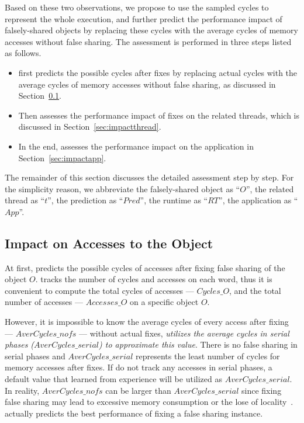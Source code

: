Based on these two observations, we propose to use the sampled cycles to represent the whole execution, and further predict the performance impact of falsely-shared objects by replacing these cycles with the average cycles of memory accesses without false sharing. The assessment is performed in three steps listed as follows. 

\begin{itemize}
\item \cheetah{} first predicts the possible cycles after fixes by replacing actual cycles with the average cycles of memory accesses without false sharing, as discussed in Section~\ref{sec:impactobject}. 

\item Then \cheetah{} assesses the performance impact of fixes on the related threads, which is discussed in Section~\ref{sec:impactthread}. 
 
\item In the end, \cheetah{} assesses the performance impact on the application in Section~\ref{sec:impactapp}. 
\end{itemize}

The remainder of this section discusses the detailed assessment step by step. For the simplicity reason, we abbreviate the falsely-shared object as ``$O$'', the related thread as ``$t$'', the prediction as ``$Pred$'', the runtime as ``$RT$'', the application as ``$App$''. 

\subsection{Impact on Accesses to the Object}
\label{sec:impactobject}

At first, \cheetah{} predicts the possible cycles of accesses after fixing false sharing of the object $O$. \cheetah{} tracks the number of cycles and accesses on each word, thus it is convenient to compute the total cycles of accesses --- $Cycles\_O$, and the total number of accesses --- $Accesses\_O$ on a specific object $O$.  

However, it is impossible to know the average cycles of every access after fixing --- $AverCycles\_{nofs}$ --- without actual fixes, {\it \cheetah{} utilizes the average cycles in serial phases ($AverCycles\_{serial}$) to approximate this value}. There is no false sharing in serial phases and $AverCycles\_{serial}$ represents the least number of cycles for memory accesses after fixes. If \cheetah{} do not track any accesses in serial phases, a default value that learned from experience will be utilized as $AverCycles\_{serial}$. In reality, $AverCycles\_{nofs}$ can be larger than $AverCycles\_{serial}$ since fixing false sharing may lead to excessive memory consumption or the lose of locality~\cite{qinzhao}. \cheetah{} actually predicts the best performance of fixing a false sharing instance. 
 
